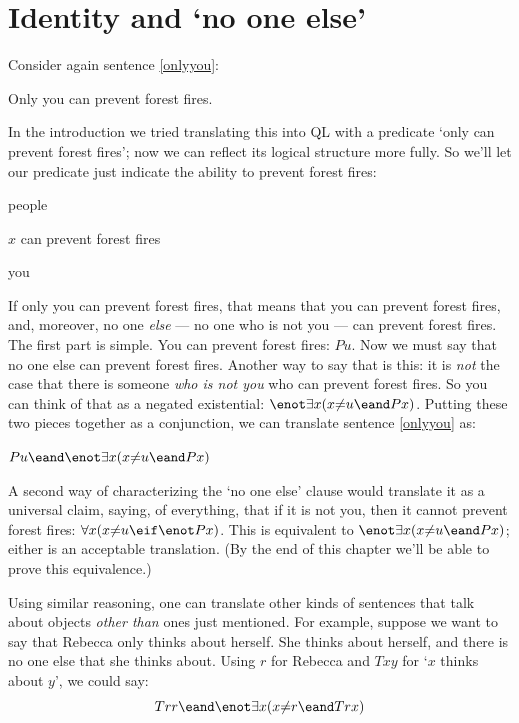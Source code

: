 \section{Identity and `no one else'}

Consider again sentence \ref{onlyyou}:

\begin{ekey}
\item[\ref{onlyyou}.] Only you can prevent forest fires.
\end{ekey}

In the introduction we tried translating this into QL with a predicate `only  \blank can prevent forest fires'; now we can reflect its logical structure more fully. So we'll let our predicate just indicate the ability to prevent forest fires:

\begin{ekey}
\item[UD:] people
\item[Px:] $x$ can prevent forest fires
\item[u:] you
\end{ekey}

If only you can prevent forest fires, that means that you can prevent forest fires, and, moreover, no one \emph{else} --- no one who is not you --- can prevent forest fires. The first part is simple. You can prevent forest fires: $Pu$. Now we must say that no one else can prevent forest fires. Another way to say that is this: it is \emph{not} the case that there is someone \emph{who is not you} who can prevent forest fires. So you can think of that as a negated existential: $\enot \exists x (x {\neq} u \eand Px)$. Putting these two pieces together as a conjunction, we can translate sentence \ref{onlyyou} as:

\begin{earg}
\item[\ref{onlyyou}.] $Pu \eand \enot \exists x (x {\neq} u \eand Px)$
\end{earg}

A second way of characterizing the `no one else' clause would translate it as a universal claim, saying, of everything, that if it is not you, then it cannot prevent forest fires: $\forall x (x {\neq} u \eif \enot Px)$. This is equivalent to $\enot \exists x (x {\neq} u \eand Px)$; either is an acceptable translation. (By the end of this chapter we'll be able to prove this equivalence.)

Using similar reasoning, one can translate other kinds of sentences that talk about objects \emph{other than} ones just mentioned. For example, suppose we want to say that Rebecca only thinks about herself. She thinks about herself, and there is no one else that she thinks about. Using $r$ for Rebecca and $Txy$ for `$x$ thinks about $y$', we could say: $$Trr \eand \enot \exists x (x {\neq} r \eand Trx)$$

